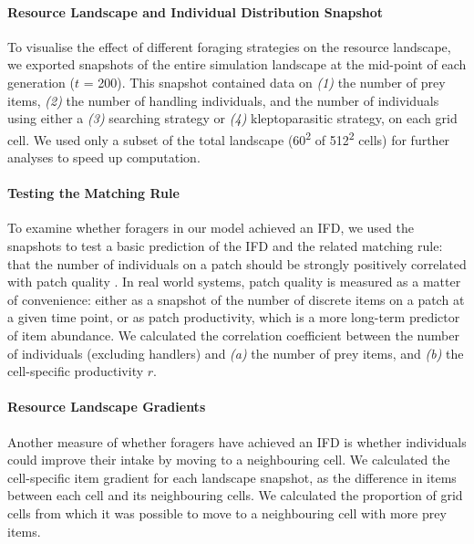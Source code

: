 \documentclass[11pt]{article}
\begin{document}
\paragraph{Resource Landscape and Individual Distribution Snapshot}

To visualise the effect of different foraging strategies on the resource landscape, we exported snapshots of the entire simulation landscape at the mid-point of each generation ($t$ = 200).
This snapshot contained data on \textit{(1)} the number of prey items, \textit{(2)} the number of handling individuals, and the number of individuals using either a \textit{(3)} searching strategy or \textit{(4)} kleptoparasitic strategy, on each grid cell.
We used only a subset of the total landscape (60\textsuperscript{2} of 512\textsuperscript{2} cells) for further analyses to speed up computation.

\paragraph{Testing the Matching Rule}

To examine whether foragers in our model achieved an IFD, we used the snapshots to test a basic prediction of the IFD and the related matching rule: that the number of individuals on a patch should be strongly positively correlated with patch quality \citep{fretwell1970,parker1978}.
In real world systems, patch quality is measured as a matter of convenience: either as a snapshot of the number of discrete items on a patch at a given time point, or as patch productivity, which is a more long-term predictor of item abundance.
We calculated the correlation coefficient between the number of individuals (excluding handlers) and \textit{(a)} the number of prey items, and \textit{(b)} the cell-specific productivity $r$.

\paragraph{Resource Landscape Gradients}

Another measure of whether foragers have achieved an IFD is whether individuals could improve their intake by moving to a neighbouring cell.
We calculated the cell-specific item gradient for each landscape snapshot, as the difference in items between each cell and its neighbouring cells.
We calculated the proportion of grid cells from which it was possible to move to a neighbouring cell with more prey items.
\end{document}
